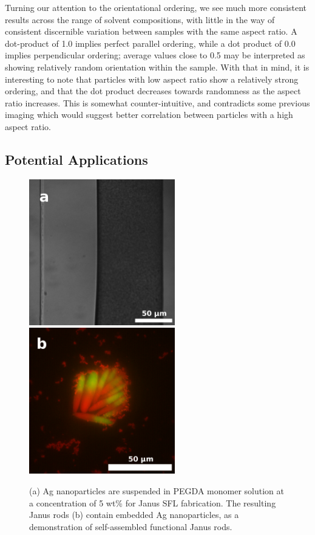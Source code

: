 Turning our attention to the orientational ordering, we see much more consistent results across the
range of solvent compositions, with little in the way of consistent discernible variation between samples with
the same aspect ratio.  A dot-product of 1.0 implies perfect parallel ordering, while a dot product of 0.0 implies
perpendicular ordering; average values close to 0.5 may be interpreted as showing relatively random orientation
within the sample.  With that in mind, it is interesting to note that particles with low aspect ratio show 
a relatively strong ordering, and that the dot product decreases towards randomness as the aspect ratio 
increases.  This is somewhat counter-intuitive, and contradicts some previous imaging which would suggest
better correlation between particles with a high aspect ratio.

\subsection{Potential Applications}

\begin{figure}
\begin{center}

\includegraphics[height=2.5in]{figures/rods/silver-microchannel-twostream.png}
\includegraphics[height=2.5in]{figures/rods/silver-fluorescence-assembly.png}
\end{center}
\caption{
(a) Ag nanoparticles are suspended in PEGDA monomer solution at 
a concentration of 5 wt\% for Janus SFL fabrication.  The resulting
Janus rods (b) contain embedded Ag nanoparticles, 
as a demonstration of self-assembled functional Janus rods.}
\label{fig:silver-janus}
\end{figure}

